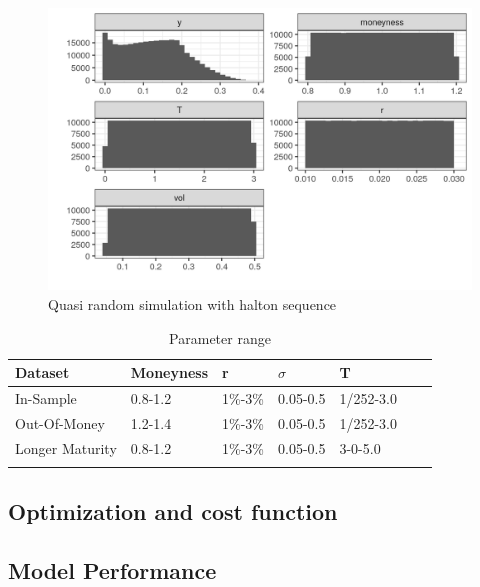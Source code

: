 \begin{figure}[H]
\centering
\includegraphics{Figures/marginalAmerPut.png}
\decoRule
\caption[Marginal distributions for american put]{Quasi random simulation with halton sequence}
\label{fig:marginalEuro}
\end{figure}

\begin{table}[H]
\caption{Parameter range}
\label{tab:totalEuroParRange}
\centering
\begin{tabular}{l l l l l l l }
\toprule
\textbf{Dataset} & \textbf{Moneyness} & \textbf{r} & \textbf{$\sigma$} & \textbf{T} \\
\midrule
In-Sample & 0.8-1.2 & 1\%-3\% & 0.05-0.5 & 1/252-3.0\\ 
Out-Of-Money & 1.2-1.4 & 1\%-3\% & 0.05-0.5 & 1/252-3.0\\ 
Longer Maturity & 0.8-1.2 & 1\%-3\% & 0.05-0.5 & 3-0-5.0\\ 
\bottomrule\\
\end{tabular}
\end{table}

\subsection{Optimization and cost function}

\subsection{Model Performance}

